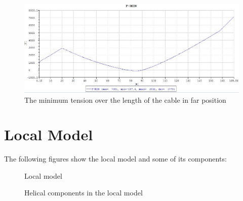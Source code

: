 \begin{figure}[H]
\centering
\includegraphics[scale=0.5]{figures/fminfar}
\caption{The minimum tension over the length of the cable in far position}
 \label{fig:fminfar}
\end{figure}

\section{Local Model}
The following figures show the local model and some of its components:

\begin{figure}[H]
\hfill
{}\hfill
\caption{Local model}
\label{fig:volt}
\end{figure}

\begin{figure}[H]
\hfill
{}\hfill
\caption{Helical components in the local model}
\label{fig:volt}
\end{figure}
